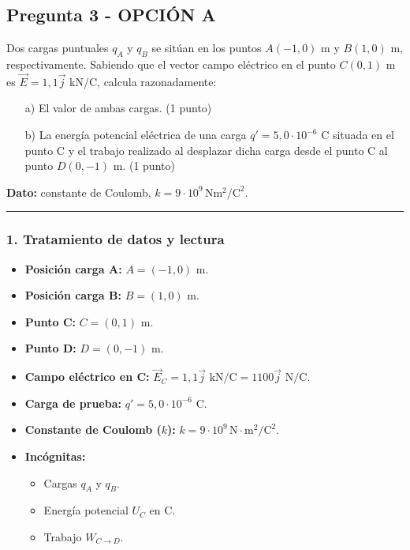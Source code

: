 \newpage

\subsection{Pregunta 3 - OPCIÓN A}
\label{subsec:3A_2025_jul_ord}

\begin{cajaenunciado}
Dos cargas puntuales $q_A$ y $q_B$ se sitúan en los puntos $A(-1,0)$ m y $B(1,0)$ m, respectivamente. Sabiendo que el vector campo eléctrico en el punto $C(0,1)$ m es $\vec{E}=1,1\vec{j}$ kN/C, calcula razonadamente:
\begin{enumerate}
    \item[a)] El valor de ambas cargas. (1 punto) 
    \item[b)] La energía potencial eléctrica de una carga $q'=5,0\cdot10^{-6}$ C situada en el punto C y el trabajo realizado al desplazar dicha carga desde el punto C al punto $D(0,-1)$ m. (1 punto) 
\end{enumerate}
\textbf{Dato:} constante de Coulomb, $k=9\cdot10^{9}\,\text{N}\text{m}^2/\text{C}^2$. 
\end{cajaenunciado}
\hrule

\subsubsection*{1. Tratamiento de datos y lectura}
\begin{itemize}
    \setlength{\itemsep}{0pt}
    \setlength{\parskip}{0pt}
    \item \textbf{Posición carga A:} $A = (-1, 0)$ m.
    \item \textbf{Posición carga B:} $B = (1, 0)$ m.
    \item \textbf{Punto C:} $C = (0, 1)$ m.
    \item \textbf{Punto D:} $D = (0, -1)$ m.
    \item \textbf{Campo eléctrico en C:} $\vec{E}_C = 1,1 \vec{j} \text{ kN/C} = 1100 \vec{j} \text{ N/C}$.
    \item \textbf{Carga de prueba:} $q' = 5,0 \cdot 10^{-6} \text{ C}$.
    \item \textbf{Constante de Coulomb ($k$):} $k = 9 \cdot 10^9 \, \text{N}\cdot\text{m}^2/\text{C}^2$.
    \item \textbf{Incógnitas:}
    \begin{itemize}
        \setlength{\itemsep}{0pt}
        \item Cargas $q_A$ y $q_B$.
        \item Energía potencial $U_C$ en C.
        \item Trabajo $W_{C \to D}$.
    \end{itemize}
\end{itemize}

